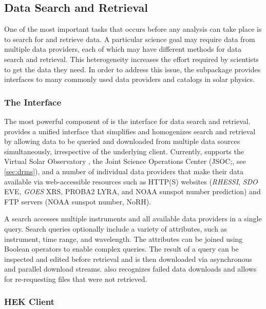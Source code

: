 
\subsection{Data Search and Retrieval}

One of the most important tasks that occurs before any analysis can take place is to search for and retrieve data.
A particular science goal may require data from multiple data providers, each of which may have different methods for data search and retrieval.
This heterogeneity increases the effort required by scientists to get the data they need.
In order to address this issue, the  subpackage provides interfaces to many commonly used data providers and catalogs in solar physics.

\subsubsection{The \Fido Interface}
\label{sec:fido}

The most powerful component of  is the \Fido interface for data search and retrieval.
\Fido provides a unified interface that simplifies and homogenizes search and retrieval by allowing data to be queried and downloaded from multiple data sources simultaneously, irrespective of the underlying client.
Currently, \Fido supports the Virtual Solar Observatory \citep[(VSO;][]{2009EM&P..104..315H}, the Joint Science Operations Center (JSOC;, see \autoref{sec:drms}), and a number of individual data providers that make their data available via web-accessible resources such as HTTP(S) websites (\textit{RHESSI}, \textit{SDO} EVE, \textit{GOES} XRS, PROBA2 LYRA, and NOAA sunspot number prediction) and FTP servers (NOAA sunspot number, NoRH).

A \Fido search accesses multiple instruments and all available data providers in a single query.
Search queries optionally include a variety of attributes, such as instrument, time range, and wavelength.
The attributes can be joined using Boolean operators to enable complex queries.
The result of a \Fido query can be inspected and edited before retrieval and is then downloaded via asynchronous and parallel download streams.
\Fido also recognizes failed data downloads and allows for re-requesting files that were not retrieved.

\subsubsection{HEK Client}
\label{sec:hek}

